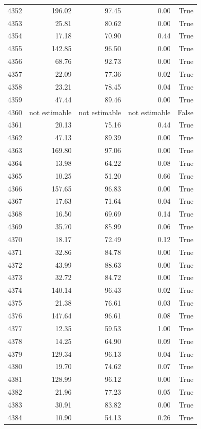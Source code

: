 \begin{longtable}{rrrrr}
4352 & 196.02 & 97.45 & 0.00 & True \\
4353 & 25.81 & 80.62 & 0.00 & True \\
4354 & 17.18 & 70.90 & 0.44 & True \\
4355 & 142.85 & 96.50 & 0.00 & True \\
4356 & 68.76 & 92.73 & 0.00 & True \\
4357 & 22.09 & 77.36 & 0.02 & True \\
4358 & 23.21 & 78.45 & 0.04 & True \\
4359 & 47.44 & 89.46 & 0.00 & True \\
4360 & not estimable & not estimable & not estimable & False \\
4361 & 20.13 & 75.16 & 0.44 & True \\
4362 & 47.13 & 89.39 & 0.00 & True \\
4363 & 169.80 & 97.06 & 0.00 & True \\
4364 & 13.98 & 64.22 & 0.08 & True \\
4365 & 10.25 & 51.20 & 0.66 & True \\
4366 & 157.65 & 96.83 & 0.00 & True \\
4367 & 17.63 & 71.64 & 0.04 & True \\
4368 & 16.50 & 69.69 & 0.14 & True \\
4369 & 35.70 & 85.99 & 0.06 & True \\
4370 & 18.17 & 72.49 & 0.12 & True \\
4371 & 32.86 & 84.78 & 0.00 & True \\
4372 & 43.99 & 88.63 & 0.00 & True \\
4373 & 32.72 & 84.72 & 0.00 & True \\
4374 & 140.14 & 96.43 & 0.02 & True \\
4375 & 21.38 & 76.61 & 0.03 & True \\
4376 & 147.64 & 96.61 & 0.08 & True \\
4377 & 12.35 & 59.53 & 1.00 & True \\
4378 & 14.25 & 64.90 & 0.09 & True \\
4379 & 129.34 & 96.13 & 0.04 & True \\
4380 & 19.70 & 74.62 & 0.07 & True \\
4381 & 128.99 & 96.12 & 0.00 & True \\
4382 & 21.96 & 77.23 & 0.05 & True \\
4383 & 30.91 & 83.82 & 0.00 & True \\
4384 & 10.90 & 54.13 & 0.26 & True \\

\end{longtable}
